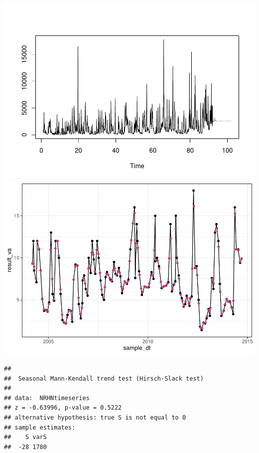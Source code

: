 \documentclass[12pt,]{article}
\begin{document}
\includegraphics{Project_Template_files/figure-latex/unnamed-chunk-6-7.pdf}
\includegraphics{Project_Template_files/figure-latex/unnamed-chunk-6-8.pdf}

\begin{verbatim}
## 
##  Seasonal Mann-Kendall trend test (Hirsch-Slack test)
## 
## data:  NRHNtimeseries
## z = -0.63996, p-value = 0.5222
## alternative hypothesis: true S is not equal to 0
## sample estimates:
##    S varS 
##  -28 1780
\end{verbatim}
\end{document}
